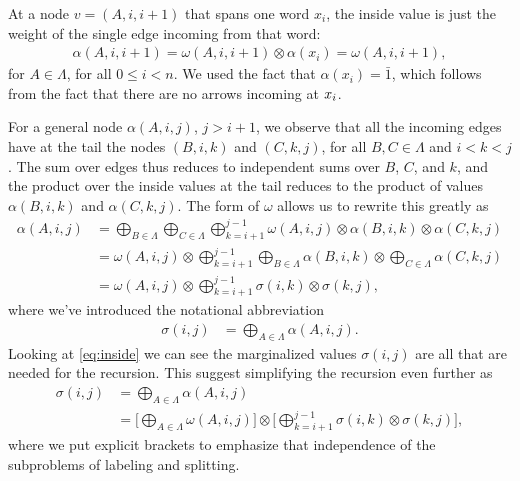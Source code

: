     At a node $v = (A, i, i+1)$ that spans one word $x_i$, the inside value is just the weight of the single edge incoming from that word:
    \begin{align}
        \label{eq:inside-base}
        \alpha(A, i, i+1) = \omega(A, i, i+1) \otimes \alpha(x_i) = \omega(A, i, i+1),
    \end{align}
    for $A \in \Lambda$, for all $0 \leq i < n$. We used the fact that $\alpha(x_i) = \bar{1}$, which follows from the fact that there are no arrows incoming at $x_i$.

    For a general node $\alpha(A, i, j)$, $j > i + 1$, we observe that all the incoming edges have at the tail the nodes $(B, i, k)$ and $(C, k, j)$, for all $B, C \in \Lambda$ and $i < k < j$. The sum over edges thus reduces to independent sums over $B$, $C$, and $k$, and the product over the inside values at the tail reduces to the product of values $\alpha(B, i, k)$ and $\alpha(C, k, j)$. The form of $\omega$ allows us to rewrite this greatly as
    \begin{align}
      \label{eq:inside}
      \alpha(A, i, j)
        &= \bigoplus_{B \in \Lambda} \bigoplus_{C \in \Lambda} \bigoplus_{k=i+1}^{j-1} \omega(A, i, j) \otimes \alpha(B,i,k) \otimes \alpha(C,k,j) \nonumber \\
        &= \omega(A, i, j) \otimes \bigoplus_{k=i+1}^{j-1} \bigoplus_{B \in \Lambda} \alpha(B,i,k) \otimes \bigoplus_{C \in \Lambda} \alpha(C,k,j) \nonumber \\
        &= \omega(A, i, j) \otimes \bigoplus_{k=i+1}^{j-1} \sigma(i,k) \otimes \sigma(k,j),
    \end{align}
    where we've introduced the notational abbreviation
    \begin{align*}
        \sigma(i,j) &= \bigoplus_{A \in \Lambda} \alpha(A,i,j).
    \end{align*}
    Looking at \ref{eq:inside} we can see the marginalized values $\sigma(i, j)$ are all that are needed for the recursion. This suggest simplifying the recursion even further as
    \begin{align}
      \label{eq:inside-simplified}
      \sigma(i, j)
        &= \bigoplus_{A \in \Lambda} \alpha(A,i,j) \nonumber \\
        &= \Bigg[ \bigoplus_{A \in \Lambda} \omega(A, i, j) \Bigg] \otimes \Bigg[\bigoplus_{k=i+1}^{j-1} \sigma(i,k) \otimes  \sigma(k,j) \Bigg],
    \end{align}
    where we put explicit brackets to emphasize that independence of the subproblems of labeling and splitting.

